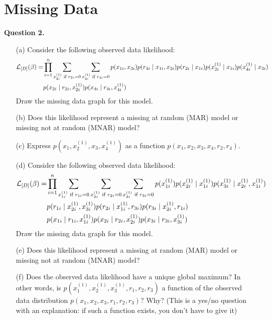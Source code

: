 \documentclass[11pt]{article}
\renewcommand{\vec}[1]{\mathbf{#1}}
\begin{document}
\begin{answertext}{12cm}{}
\end{answertext}

\newpage %

\section*{Missing Data}

{\bf Question 2.}

\begin{enumerate}
\item[(a)] Consider the following observed data likelihood:
{\small
\begin{align*}
{\cal L}_{[D]}(\vec{\beta}) =& \prod_{i=1}^n \sum_{x^{(1)}_{2i} \text{ if }r_{2i}=0} \sum_{x^{(1)}_{4i} \text{ if }r_{4i}=0}  p(x_{1i}, x_{3i}) p(r_{4i} \mid x_{1i}, x_{3i}) p(r_{2i} \mid x_{1i})
p(x^{(1)}_{2i} \mid x_{1i})
p(x^{(1)}_{4i} \mid x_{3i}) \\
& 
p(x_{2i} \mid r_{2i}, x^{(1)}_{2i})
p(x_{4i} \mid r_{4i}, x^{(1)}_{4i})
\end{align*}
}
Draw the missing data graph for this model.
\item[(b)] Does this likelihood represent a missing at random (MAR) model or missing not at random (MNAR) model?
\item[(c)] Express $p(x_1, x_2^{(1)}, x_3, x_4^{(1)})$ as a function $p(x_1, x_2, x_3, x_4, r_2, r_4)$.
\item[(d)] Consider the following observed data likelihood:
{\small
\begin{align*}
{\cal L}_{[D]}(\vec{\beta}) =&
\prod_{i=1}^n
\sum_{x^{(1)}_{1i} \text{ if }r_{1i}=0}
\sum_{x^{(1)}_{2i} \text{ if }r_{2i}=0}
\sum_{x^{(1)}_{3i} \text{ if }r_{3i}=0}
p(x^{(1)}_{1i}) p(x^{(1)}_{2i} \mid x^{(1)}_{1i})
p(x^{(1)}_{3i} \mid x^{(1)}_{2i}, x^{(1)}_{1i})\\
& 
p(r_{1i} \mid x^{(1)}_{2i}, x^{(1)}_{3i})
p(r_{2i} \mid x^{(1)}_{1i}, r_{3i})
p(r_{3i} \mid x^{(1)}_{2i}, r_{1i})
\\
&
p(x_{1i} \mid r_{1i}, x^{(1)}_{1i})
p(x_{2i} \mid r_{2i}, x^{(1)}_{2i})
p(x_{3i} \mid r_{3i}, x^{(1)}_{3i})
\end{align*}
}
Draw the missing data graph for this model.
\item[(e)] Does this likelihood represent a missing at random (MAR) model or missing not at random (MNAR) model?
\item[(f)] Does the observed data likelihood have a unique global maximum?  In other words, 
 is $p(x_1^{(1)}, x_2^{(1)}, x_3^{(1)}, r_1, r_2, r_3)$ a function of the observed data distribution $p(x_1, x_2, x_3, r_1, r_2, r_3)$?  Why?  (This is a yes/no question with an explanation: if such a function exists, you don't have to give it)
\end{enumerate}
\end{document}
